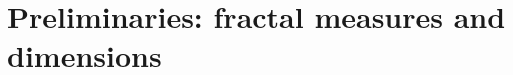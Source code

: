\documentclass[12pt]{article}
\newtheorem{theorem}{Theorem}[section]
\theoremstyle{definition}
\theoremstyle{remark}
\newtheorem{remark}{{Remark}}[section]
\begin{document}


\bigskip 




\section{Preliminaries: fractal measures and dimensions}\label{22}
\end{document}

